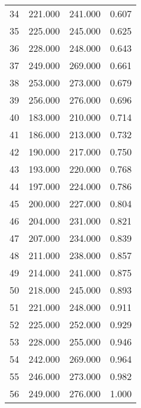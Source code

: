 \begin{tabular}{cccc}
  34 & 221.000 & 241.000 & 0.607 \\ 
  35 & 225.000 & 245.000 & 0.625 \\ 
  36 & 228.000 & 248.000 & 0.643 \\ 
  37 & 249.000 & 269.000 & 0.661 \\ 
  38 & 253.000 & 273.000 & 0.679 \\ 
  39 & 256.000 & 276.000 & 0.696 \\ 
  40 & 183.000 & 210.000 & 0.714 \\ 
  41 & 186.000 & 213.000 & 0.732 \\ 
  42 & 190.000 & 217.000 & 0.750 \\ 
  43 & 193.000 & 220.000 & 0.768 \\ 
  44 & 197.000 & 224.000 & 0.786 \\ 
  45 & 200.000 & 227.000 & 0.804 \\ 
  46 & 204.000 & 231.000 & 0.821 \\ 
  47 & 207.000 & 234.000 & 0.839 \\ 
  48 & 211.000 & 238.000 & 0.857 \\ 
  49 & 214.000 & 241.000 & 0.875 \\ 
  50 & 218.000 & 245.000 & 0.893 \\ 
  51 & 221.000 & 248.000 & 0.911 \\ 
  52 & 225.000 & 252.000 & 0.929 \\ 
  53 & 228.000 & 255.000 & 0.946 \\ 
  54 & 242.000 & 269.000 & 0.964 \\ 
  55 & 246.000 & 273.000 & 0.982 \\ 
  56 & 249.000 & 276.000 & 1.000 \\ 
   \hline
\end{tabular}
